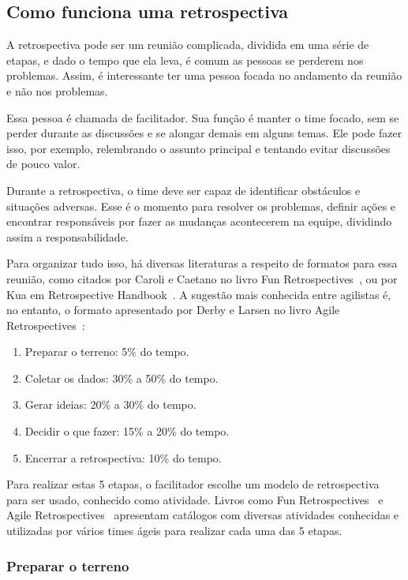 \subsection{Como funciona uma retrospectiva}

A retrospectiva pode ser um reunião complicada, dividida em uma série de etapas, e dado o tempo que ela leva, é comum as pessoas se perderem nos problemas. Assim, é interessante ter uma pessoa focada no andamento da reunião e não nos problemas. 

Essa pessoa é chamada de facilitador. Sua função é manter o time focado, sem se perder durante as discussões e se alongar demais em alguns temas. Ele pode fazer isso, por exemplo, relembrando o assunto principal e tentando evitar discussões de pouco valor.

Durante a retrospectiva, o time deve ser capaz de identificar obstáculos e situações adversas. Esse é o momento para resolver os problemas, definir ações e encontrar responsáveis por fazer as mudanças acontecerem na equipe, dividindo assim a responsabilidade.

Para organizar tudo isso, há diversas literaturas a respeito de formatos para essa reunião, como citados por Caroli e Caetano no livro Fun Retrospectives~\cite{funRetrospectives}, ou por Kua em Retrospective Handbook~\cite{handRetrospectives}. A sugestão mais conhecida entre agilistas é, no entanto, o formato apresentado por Derby e Larsen no livro Agile Retrospectives~\cite{retrospectives}: 

\begin{enumerate}
	\item Preparar o terreno: 5\% do tempo.
	\item Coletar os dados: 30\% a 50\% do tempo.
	\item Gerar ideias: 20\% a 30\% do tempo.
	\item Decidir o que fazer: 15\% a 20\% do tempo.
	\item Encerrar a retrospectiva: 10\% do tempo.
\end{enumerate}

Para realizar estas 5 etapas, o facilitador escolhe um modelo de retrospectiva para ser usado, conhecido como atividade. Livros como Fun Retrospectives~\cite{funRetrospectives} e Agile Retrospectives~\cite{retrospectives} apresentam catálogos com diversas atividades conhecidas e utilizadas por vários times ágeis para realizar cada uma das 5 etapas.

\subsubsection*{Preparar o terreno}

